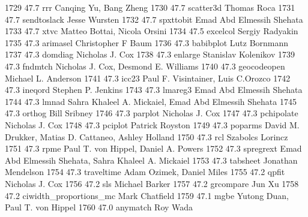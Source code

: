   1729     47.7    rrr           Canqing Yu, Bang Zheng                  
  1730     47.7    scatter3d     Thomas Roca                             
  1731     47.7    sendtoslack   Jesse Wursten                           
  1732     47.7    spxttobit     Emad Abd Elmessih Shehata               
  1733     47.7    xtvc          Matteo Bottai, Nicola Orsini            
  1734     47.5    excelcol      Sergiy Radyakin                         
  1735     47.3    arimasel      Christopher F Baum                      
  1736     47.3    babibplot     Lutz Bornmann                           
  1737     47.3    domdiag       Nicholas J. Cox                         
  1738     47.3    enlarge       Stanislav Kolenikov                     
  1739     47.3    fndmtch       Nicholas J. Cox, Desmond E. Williams    
  1740     47.3    geocodeopen   Michael L. Anderson                     
  1741     47.3    icc23         Paul F. Visintainer, Luis C.Orozco      
  1742     47.3    ineqord       Stephen P. Jenkins                      
  1743     47.3    lmareg3       Emad Abd Elmessih Shehata               
  1744     47.3    lmnad         Sahra Khaleel A. Mickaiel, Emad Abd     
                                   Elmessih Shehata                        
  1745     47.3    orthog        Bill Sribney                            
  1746     47.3    parplot       Nicholas J. Cox                         
  1747     47.3    pchipolate    Nicholas J. Cox                         
  1748     47.3    pciplot       Patrick Royston                         
  1749     47.3    poparms       David M. Drukker, Matias D. Cattaneo,   
                                   Ashley Holland                          
  1750     47.3    rcl           Szabolcs Lorincz                        
  1751     47.3    rpme          Paul T. von Hippel, Daniel A. Powers    
  1752     47.3    spregrext     Emad Abd Elmessih Shehata, Sahra        
                                   Khaleel A. Mickaiel                     
  1753     47.3    tabsheet      Jonathan Mendelson                      
  1754     47.3    traveltime    Adam Ozimek, Daniel Miles               
  1755     47.2    qpfit         Nicholas J. Cox                         
  1756     47.2    sls           Michael Barker                          
  1757     47.2    grcompare     Jun Xu                                  
  1758     47.2    ciwidth_proportions_mc  Mark Chatfield                          
  1759     47.1    mgbe          Yutong Duan, Paul T. von Hippel         
  1760     47.0    anymatch      Roy Wada                                
